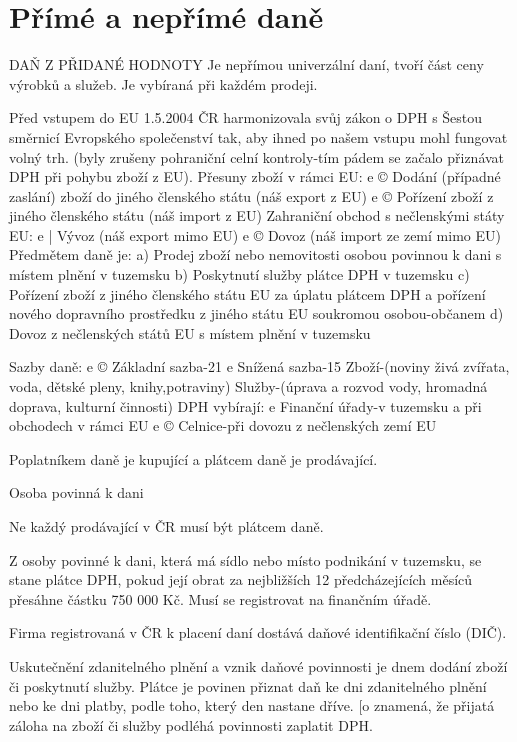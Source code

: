 \chapter{Přímé a nepřímé daně}

DAŇ Z PŘIDANÉ HODNOTY
Je nepřímou univerzální daní, tvoří část ceny výrobků a služeb.
Je vybíraná při každém prodeji.

Před vstupem do EU 1.5.2004 ČR harmonizovala svůj zákon o DPH s Šestou směrnicí
Evropského společenství tak, aby ihned po našem vstupu mohl fungovat volný trh. (byly
zrušeny pohraniční celní kontroly-tím pádem se začalo přiznávat DPH při pohybu zboží
z EU).
Přesuny zboží v rámci EU:
e © Dodání (případné zaslání) zboží do jiného členského státu (náš export z EU)
e © Pořízení zboží z jiného členského státu (náš import z EU)
Zahraniční obchod s nečlenskými státy EU:
e | Vývoz (náš export mimo EU)
e © Dovoz (náš import ze zemí mimo EU)
Předmětem daně je:
a) Prodej zboží nebo nemovitosti osobou povinnou k dani s místem plnění v tuzemsku
b) Poskytnutí služby plátce DPH v tuzemsku
c) Pořízení zboží z jiného členského státu EU za úplatu plátcem DPH a pořízení nového
dopravního prostředku z jiného státu EU soukromou osobou-občanem
d) Dovoz z nečlenských států EU s místem plnění v tuzemsku

Sazby daně:
e © Základní sazba-21%
e Snížená sazba-15%
Zboží-(noviny živá zvířata, voda, dětské pleny, knihy,potraviny)
Služby-(úprava a rozvod vody, hromadná doprava, kulturní činnosti)
DPH vybírají:
e Finanční úřady-v tuzemsku a při obchodech v rámci EU
e © Celnice-při dovozu z nečlenských zemí EU

Poplatníkem daně je kupující a plátcem daně je prodávající.

Osoba povinná k dani

Ne každý prodávající v ČR musí být plátcem daně.

Z osoby povinné k dani, která má sídlo nebo místo podnikání v tuzemsku, se stane plátce
DPH, pokud její obrat za nejbližších 12 předcházejících měsíců přesáhne částku 750 000 Kč.
Musí se registrovat na finančním úřadě.

Firma registrovaná v ČR k placení daní dostává daňové identifikační číslo (DIČ).

Uskutečnění zdanitelného plnění a vznik daňové povinnosti je dnem dodání zboží či
poskytnutí služby. Plátce je povinen přiznat daň ke dni zdanitelného plnění nebo ke dni
platby, podle toho, který den nastane dříve. [o znamená, že přijatá záloha na zboží či služby
podléhá povinnosti zaplatit DPH.

